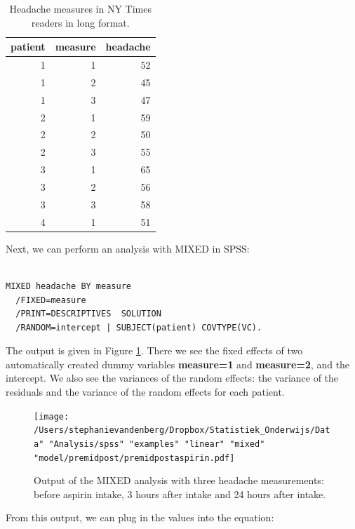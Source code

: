 \documentclass[]{report}\usepackage[]{graphicx}\usepackage[]{color}
\begin{document}
\begin{table}[ht]
\centering
\caption{Headache measures in NY Times readers in long format.} 
\label{tab:analysispremidpost2}
\begin{tabular}{rrr}
  \hline
patient & measure & headache \\ 
  \hline
1 & 1 & 52 \\ 
  1 & 2 & 45 \\ 
  1 & 3 & 47 \\ 
  2 & 1 & 59 \\ 
  2 & 2 & 50 \\ 
  2 & 3 & 55 \\ 
  3 & 1 & 65 \\ 
  3 & 2 & 56 \\ 
  3 & 3 & 58 \\ 
  4 & 1 & 51 \\ 
   \hline
\end{tabular}
\end{table}


Next, we can perform an analysis with MIXED in SPSS:

\begin{verbatim}

MIXED headache BY measure
  /FIXED=measure
  /PRINT=DESCRIPTIVES  SOLUTION
  /RANDOM=intercept | SUBJECT(patient) COVTYPE(VC).
\end{verbatim}

The output is given in Figure \ref{fig:premidpostaspirin}. There we see the fixed effects of two automatically created dummy variables \textbf{measure=1} and \textbf{measure=2}, and the intercept. We also see the variances of the random effects: the variance of the residuals and the variance of the random effects for each patient.


\begin{figure}[h]
    \begin{center}
       \texttt{[image: /Users/stephanievandenberg/Dropbox/Statistiek\_Onderwijs/Data" "Analysis/spss" "examples" "linear" "mixed" "model/premidpost/premidpostaspirin.pdf]}
    \end{center}
    \label{fig:premidpostaspirin}
    \caption{Output of the MIXED analysis with three headache measurements: before aspirin intake, 3 hours after intake and 24 hours after intake.}
\end{figure}



From this output, we can plug in the values into the equation:
\end{document}
